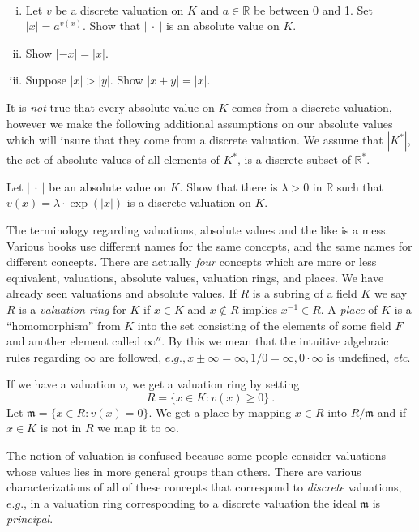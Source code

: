 \begin{exo}
\label{e28.14}
~
\begin{enumerate}[(i)]
\item
Let $v$ be a discrete valuation on $K$ and $a\in \mathbb{R}$ be between $0$ and 1. Set
$|x|=a^{v(x)}$. Show that $|\: \cdot\: |$ is an absolute value on $K$.
\item
Show $|-x|=|x|$.
\item
Suppose $|x|>|y|$. Show $|x+y|=|x|$.
\end{enumerate}
\end{exo}
It is {\it not} true that every absolute value on $K$ comes from a discrete valuation, however we make the following additional assumptions on our absolute values which will insure that they come from a discrete valuation. We assume that
$|K^{*}|$, the set of absolute values of all elements of $K^{*}$, is a discrete subset of $\mathbb{R}^{*}$.

\begin{exo}
\label{e2.8.15}
Let $|\: \cdot\:|$ be an absolute value on $K$. Show that there is $\lambda>0$ in $\mathbb{R}$ such that $v(x)=\lambda\cdot\exp(|x|)$ is a discrete valuation on $K$.
\end{exo}

\rem
The terminology regarding valuations, absolute values and the like is a mess. Various books use different names for the same concepts, and the same names for different concepts. There are actually {\it four} concepts which are more or less equivalent, valuations, absolute values, valuation rings, and places. We have already seen valuations and absolute values. If $R$ is a subring of a field $K$ we say $R$ is a {\it valuation ring} for $K$ if $x\in K$ and $x\not\in R$ implies $x^{-1}\in R$. A {\it place} of $K$ is a ``homomorphism'' from $K$ into the set consisting of the elements of some field $F$ and another element called $\infty''$. By this we mean that the intuitive algebraic rules regarding $\infty$ are followed, $e.g., x\pm\infty=\infty, 1/0=\infty, 0\cdot\infty$ is undefined, {\it etc}.

If we have a valuation $v$, we get a valuation ring by setting
$$
R=\{x\in K:v(x)\geq 0\}\ .
$$
Let $\mathfrak{m}=\{x\in R:v(x)=0\}$. We get a place by mapping $x\in R$ into $R/\mathfrak{m}$ and if $x\in K$ is not in $R$ we map it to $\infty$.

The notion of valuation is confused because some people consider valuations whose values lies in more general groups than others. There are various characterizations of all of these concepts that correspond to {\it discrete} valuations, $e.g.$, in a valuation ring corresponding to a discrete valuation the ideal $\mathfrak{m}$ is {\it principal}.

